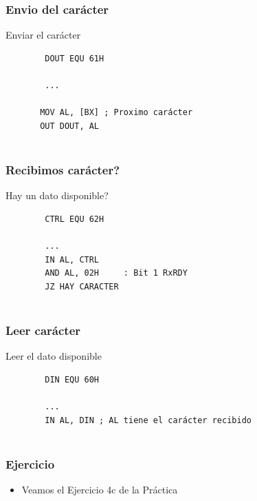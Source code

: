 \documentclass{beamer}
\begin{document}
\begin{frame}[fragile]
\frametitle{Envio del carácter}
\begin{block}{Enviar el carácter}
 \begin{verbatim}
        DOUT EQU 61H
         
        ...
           
       MOV AL, [BX] ; Proximo carácter
       OUT DOUT, AL
             
 \end{verbatim}
\end{block}

\end{frame}

\begin{frame}[fragile]
\frametitle{Recibimos carácter?}
\begin{block}{Hay un dato disponible?}
 \begin{verbatim}
        CTRL EQU 62H
         
        ...
        IN AL, CTRL
        AND AL, 02H     : Bit 1 RxRDY
        JZ HAY CARACTER
             
 \end{verbatim}
\end{block}

\end{frame}

\begin{frame}[fragile]
\frametitle{Leer carácter}
\begin{block}{Leer el dato disponible}
 \begin{verbatim}
        DIN EQU 60H
         
        ...
        IN AL, DIN ; AL tiene el carácter recibido
        
 \end{verbatim}
\end{block}

\end{frame}

\begin{frame}[fragile]
\frametitle{Ejercicio}

\begin{itemize}
 \item Veamos el Ejercicio 4c de la Práctica
\end{itemize}

\end{frame}
\end{document}
